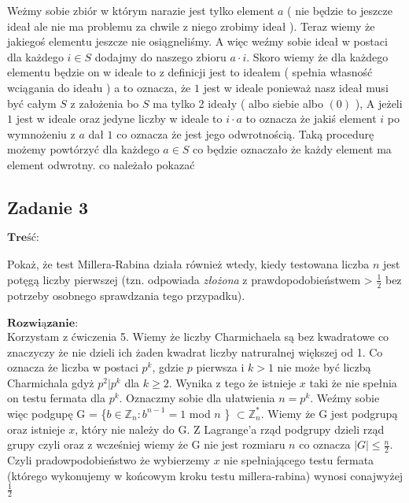 Weżmy sobie zbiór w którym narazie jest tylko element $a$ ( nie będzie to jeszcze ideał ale nie ma problemu za chwile z niego zrobimy ideał ). Teraz wiemy że jakiegoś elementu jeszcze nie osiągneliśmy. A więc weźmy sobie ideał w postaci dla każdego $i \in S$ dodajmy do naszego zbioru $a\cdot i$. Skoro wiemy że dla każdego elementu będzie on w ideale to z definicji jest to ideałem ( spełnia własność wciągania do ideału ) a to oznacza, że $1$ jest w ideale ponieważ nasz ideał musi być całym $S$ z założenia bo $S$ ma tylko 2 ideały ( albo siebie albo $(0)$ ), A jeżeli $1$ jest w ideale oraz jedyne liczby w ideale to $i\cdot a$ to oznacza że jakiś element $i$ po wymnożeniu z $a$ dał $1$ co oznacza że jest jego odwrotnością. Taką procedurę możemy powtórzyć dla każdego $a \in S$ co będzie oznaczało że każdy element ma element odwrotny. co należało pokazać

\subsection{Zadanie 3}
$\textbf{Treść:}$  \\ \\
Pokaż, że test Millera-Rabina działa również wtedy, kiedy testowana liczba
$n$ jest potęgą liczby pierwszej (tzn. odpowiada \textit{złożona} z prawdopodobieństwem > $\frac{1}{2}$
bez potrzeby osobnego sprawdzania tego przypadku).
\\
\\
$\textbf{Rozwiązanie:}$ \\
 Korzystam z ćwiczenia 5. Wiemy że liczby Charmichaela są bez kwadratowe co znaczyczy że nie dzieli ich żaden kwadrat liczby natruralnej większej od 1. Co oznacza że liczba w postaci $p^k$, gdzie $p$ pierwsza i $k > 1$ nie może być liczbą Charmichala gdyż $p^2 | p^k$ dla $k \ge 2$. Wynika z tego że istnieje $x$ taki że nie spełnia on testu fermata dla $p^k$. Oznaczmy sobie dla ułatwienia $n = p^k$. Weźmy sobie więc podgupę G = \{$b \in  \mathbb{Z}_{n} : b^{n-1} = 1$ mod $n$ \} $\subset \mathbb{Z}_{n}^{*}$. Wiemy że G jest podgrupą oraz istnieje $x$, który nie należy do G. Z Lagrange'a rząd podgrupy dzieli rząd grupy czyli oraz z wcześniej wiemy że G nie jest rozmiaru $n$ co oznacza $|G| \leq \frac{n}{2}$. Czyli pradowpodobieństwo że wybierzemy $x$ nie spełniającego testu fermata (którego wykonujemy w końcowym kroku testu millera-rabina) wynosi conajwyżej $\frac{1}{2}$


